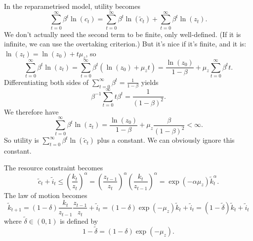 \documentclass[11pt,letterpaper,reqno,oneside]{article}
\begin{document}
In the reparametrised model, utility becomes
%
\begin{equation*}
	\sum_{t=0}^\infty \beta^t \ln( c_t )
	= \sum_{t=0}^\infty \beta^t \ln( \widetilde{c}_t )
	+ \sum_{t=0}^\infty \beta^t \ln( z_t ) .
\end{equation*}
%
We don't actually need the second term to be finite, only well-defined. (If it is infinite, we can use the overtaking criterion.) But it's nice if it's finite, and it is: $\ln(z_t) = \ln(z_0) + t \mu_z$, so
%
\begin{equation*}
	\sum_{t=0}^\infty \beta^t \ln( z_t )
	= \sum_{t=0}^\infty \beta^t \left( \ln(z_0) + \mu_z t \right)
	= \frac{\ln(z_0)}{1-\beta} + \mu_z \sum_{t=0}^\infty \beta^t t .
\end{equation*}
%
Differentiating both sides of $\sum_{t=0}^\infty \beta^t = \frac{1}{1-\beta}$ yields
%
\begin{equation*}
	\beta^{-1} \sum_{t=0}^\infty t \beta^t = \frac{1}{(1-\beta)^2} .
\end{equation*}
%
We therefore have
%
\begin{equation*}
	\sum_{t=0}^\infty \beta^t \ln( z_t )
	= \frac{\ln(z_0)}{1-\beta} + \mu_z \frac{\beta}{(1-\beta)^2} < \infty .
\end{equation*}
%
So utility is $\sum_{t=0}^\infty \beta^t \ln \left( \widetilde{c}_t \right)$ plus a constant. We can obviously ignore this constant.

The resource constraint becomes
%
\begin{equation*}
	\widetilde{c}_t + \widetilde{i}_t 
	\leq \left(\frac{k_t}{z_t}\right)^\alpha 
	= \left(\frac{z_{t-1}}{z_t}\right)^\alpha 
	\left(\frac{k_t}{z_{t-1}}\right)^\alpha 
	= \exp(-\alpha \mu_z )
	\widetilde{k}_t^\alpha .
\end{equation*}
%
The law of motion becomes
%
\begin{equation*}
	\widetilde{k}_{t+1}
	= (1-\delta) \frac{k_t}{z_{t-1}} \frac{z_{t-1}}{z_t} + \widetilde{i}_t
	= (1-\delta) \exp( - \mu_z ) \widetilde{k}_t + \widetilde{i}_t 
	= \left(1-\widetilde{\delta}\right) \widetilde{k}_t + \widetilde{i}_t 
\end{equation*}
%
where $\widetilde{\delta} \in (0,1)$ is defined by
%
\begin{equation*}
	1-\widetilde{\delta} = (1-\delta) \exp( - \mu_z ) .
\end{equation*}
\end{document}
